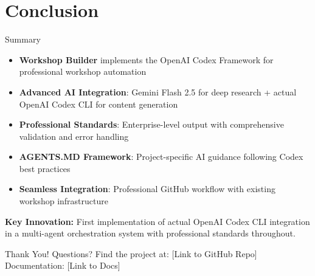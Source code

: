 \documentclass{beamer}
\begin{document}
\section{Conclusion} \label{L_section_conclusion}

\begin{frame}{Summary}
    \begin{itemize}
        \item \textbf{Workshop Builder} implements the OpenAI Codex Framework for professional workshop automation
        \item \textbf{Advanced AI Integration}: Gemini Flash 2.5 for deep research + actual OpenAI Codex CLI for content generation
        \item \textbf{Professional Standards}: Enterprise-level output with comprehensive validation and error handling
        \item \textbf{AGENTS.MD Framework}: Project-specific AI guidance following Codex best practices
        \item \textbf{Seamless Integration}: Professional GitHub workflow with existing workshop infrastructure
    \end{itemize}
    \vspace{1em}
    \textbf{Key Innovation:} First implementation of actual OpenAI Codex CLI integration in a multi-agent orchestration system with professional standards throughout.
\end{frame}

\begin{frame}
    \centering
    \Huge Thank You!
    \vspace{1em}
    \Large Questions?
    \vspace{2em}
    \normalsize
    Find the project at: [Link to GitHub Repo]
    \newline
    Documentation: [Link to Docs]
\end{frame}
\end{document}
